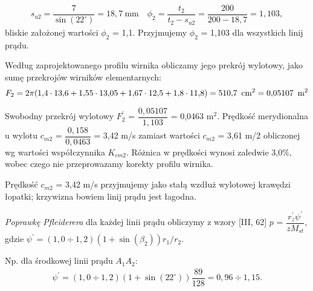 \documentclass[a4paper]{book}
\begin{document}
\begin{gather*}
%
s_{u2} = \dfrac{7}{\mathrm{\sin(22^{\circ})}} = 18{,}7 \: \text{mm} \quad \phi_2 = \dfrac{t_2}{t_2 - s_{u2}} = \dfrac{200}{200 - 18{,}7} = 1{,}103,
%
\end{gather*}
bliskie założonej wartości $\phi_2$ = 1,1. Przyjmujemy $\phi_2$ = 1,103 dla wszystkich linij prądu. 
\par Według zaprojektowanego profilu wirnika obliczamy jego prekrój wylotowy, jako sumę przekrojów wirników elementarnych:
\begin{gather*}
%
F_2 = 2 \pi (1{,}4 \cdot 13{,}6 + 1{,}55 \cdot 13{,}05 + 1{,}67 \cdot 12{,}5 + 1{,}8 \cdot 11{,}8) = 510{,}7 \enskip \mathrm{cm^2} = 0{,}05107 \enskip \mathrm{m^2}
%
\end{gather*}
\par Swobodny przekrój wylotowy $F_2^\prime$ = $\dfrac{0{,}05107}{1{,}103}$ = 0,0463 $\mathrm{m^2}$. Prędkość merydionalna u wylotu $c_{m2}$ = $\dfrac{0{,}158}{0{,}0463}$ = 3,42 m/s zamiast wartości $c_{m2}$ = 3,61 m/2 obliczonej wg wartości współczynnika $K_{cm2}$. Różnica w prędkości wynosi zaledwie 3,0\%, wobec czego nie przeprowazamy korekty profilu wirnika. 
\par	Prędkość $c_{m2}$ = 3,42 m/s przyjmujemy jako stałą wzdłuż wylotowej krawędzi łopatki; krzywizna bowiem linij prądu jest łagodna.
	
	\textit{Poprawkę Pfleiderera} dla każdej linii prądu obliczymy z wzory [III, 62] $p$ = $\dfrac{r_z^\prime \psi^\prime}{z M_{st}}$, gdzie $\psi^\prime = (1{,}0\div1{,}2)(1+\sin(\beta_2))r_1/r_2$.
	\par Np. dla środkowej linii prądu $A_1A_2$:
\begin{gather*}
%
\psi^\prime = (1{,}0\div1{,}2)(1 + \sin(22^{\circ}))\dfrac{89}{128} = 0{,}96 \div 1{,}15.
%
\end{gather*}
	
\end{document}
